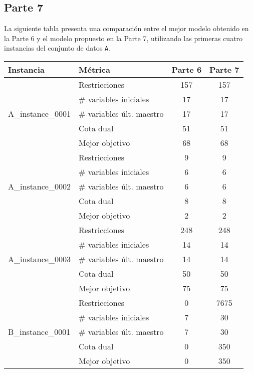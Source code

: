 \documentclass[a4paper,12pt]{article}
\begin{document}
\subsection{Parte 7}
La siguiente tabla presenta una comparación entre el mejor modelo obtenido en la Parte 6 y el modelo propuesto en la Parte 7, utilizando las primeras cuatro instancias del conjunto de datos \texttt{A}.

\begin{table}[h!]
\centering
\renewcommand{\arraystretch}{1.2}
\begin{tabularx}{\textwidth}{lXcc}
\toprule
\textbf{Instancia} & \textbf{Métrica} & \textbf{Parte 6} & \textbf{Parte 7} \\
\midrule
\multirow{5}{*}{A\_instance\_0001} 
  & Restricciones               & 157   & 157   \\
  & \# variables iniciales      & 17  & 17   \\
  & \# variables últ. maestro   & 17  & 17  \\
  & Cota dual                   & 51  & 51  \\
  & Mejor objetivo              & 68   & 68  \\
\midrule
\multirow{5}{*}{A\_instance\_0002} 
  & Restricciones               & 9   & 9  \\
  & \# variables iniciales      & 6   & 6   \\
  & \# variables últ. maestro   & 6   & 6   \\
  & Cota dual                   & 8   & 8   \\
  & Mejor objetivo              & 2   & 2   \\
\midrule
\multirow{5}{*}{A\_instance\_0003} 
  & Restricciones               & 248   & 248   \\
  & \# variables iniciales      & 14   & 14 \\
  & \# variables últ. maestro   & 14   & 14   \\
  & Cota dual                   & 50   & 50   \\
  & Mejor objetivo              & 75   & 75   \\
\midrule
\multirow{5}{*}{B\_instance\_0001} 
  & Restricciones               & 0   & 7675   \\
  & \# variables iniciales      & 7   & 30   \\
  & \# variables últ. maestro   & 7   & 30   \\
  & Cota dual                   & 0   & 350   \\
  & Mejor objetivo              & 0   & 350   \\

\end{tabularx}
\end{table}
\end{document}
